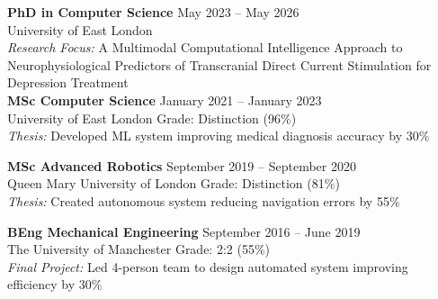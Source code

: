 \documentclass[10pt,a4paper]{article}
\begin{document}
\textbf{PhD in Computer Science} \hfill May 2023 -- May 2026\\
University of East London\\
\textit{Research Focus:} A Multimodal Computational Intelligence Approach to Neurophysiological Predictors of Transcranial Direct Current Stimulation for Depression Treatment\\

\textbf{MSc Computer Science} \hfill January 2021 -- January 2023\\
University of East London \hfill Grade: Distinction (96\%)\\
\textit{Thesis:} Developed ML system improving medical diagnosis accuracy by 30\%

\textbf{MSc Advanced Robotics} \hfill September 2019 -- September 2020\\
Queen Mary University of London \hfill Grade: Distinction (81\%)\\
\textit{Thesis:} Created autonomous system reducing navigation errors by 55\%

\textbf{BEng Mechanical Engineering} \hfill September 2016 -- June 2019\\
The University of Manchester \hfill Grade: 2:2 (55\%)\\
\textit{Final Project:} Led 4-person team to design automated system improving efficiency by 30\%
\end{document}

